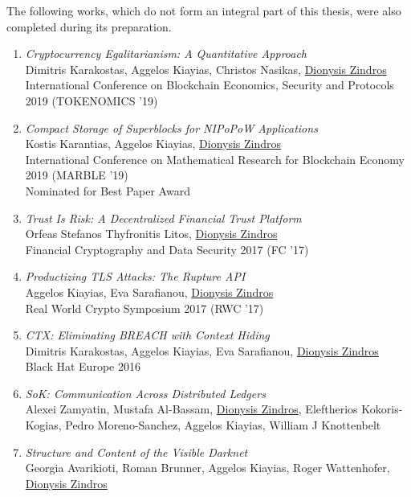 The following works, which do not form an integral part of this thesis, were
also completed during its preparation.

\begin{enumerate}
  \item
    \emph{Cryptocurrency Egalitarianism: A Quantitative Approach}\nocite{egalitarianism}\\
    Dimitris Karakostas, Aggelos Kiayias, Christos Nasikas, \underline{Dionysis Zindros}\\
    International Conference on Blockchain Economics, Security and Protocols 2019 (TOKENOMICS '19)
  \item
    \emph{Compact Storage of Superblocks for NIPoPoW Applications}\nocite{compactsuperblocks}\\
    Kostis Karantias, Aggelos Kiayias, \underline{Dionysis Zindros}\\
    International Conference on Mathematical Research for Blockchain Economy 2019 (MARBLE '19)\\
    Nominated for Best Paper Award
  \item
    \emph{Trust Is Risk: A Decentralized Financial Trust Platform}\nocite{trust-is-risk}\\
    Orfeas Stefanos Thyfronitis Litos, \underline{Dionysis Zindros}\\
    Financial Cryptography and Data Security 2017 (FC '17)
  \item
    \emph{Productizing TLS Attacks: The Rupture API}\\
    Aggelos Kiayias, Eva Sarafianou, \underline{Dionysis Zindros}\\
    Real World Crypto Symposium 2017 (RWC '17)
  \item
    \emph{CTX: Eliminating BREACH with Context Hiding}\\
    Dimitris Karakostas, Aggelos Kiayias, Eva Sarafianou, \underline{Dionysis Zindros}\\
    Black Hat Europe 2016
  \item
    \emph{SoK: Communication Across Distributed Ledgers}\nocite{crosschain-sok}\\
    Alexei Zamyatin, Mustafa Al-Bassam, \underline{Dionysis Zindros}, Eleftherios Kokoris-Kogias, Pedro Moreno-Sanchez, Aggelos Kiayias, William J Knottenbelt\\
  \item
    \emph{Structure and Content of the Visible Darknet}\nocite{darknet}\\
    Georgia Avarikioti, Roman Brunner, Aggelos Kiayias, Roger Wattenhofer, \underline{Dionysis Zindros}\\
\end{enumerate}
